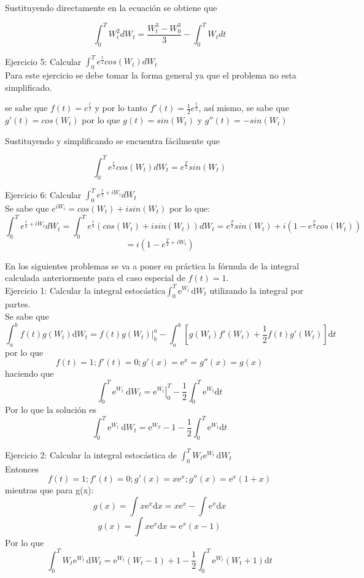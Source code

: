 \documentclass[11pt,fleqn]{book} %
\numberwithin{equation}{section} %
\numberwithin{figure}{section} %
\numberwithin{table}{section} %
\begin{document}
Sustituyendo directamente en la ecuación se obtiene que

$$\int^{T}_{0}W_t^2 dW_t=\frac{W_t^3-W_0^3}{3}-\int^{T}_{0}W_t dt$$

Ejercicio 5: Calcular $\int^{T}_{0}e^{\frac{t}{2}}cos(W_t) dW_t$
\ \\%
Para este ejercicio se debe tomar la forma general ya que el problema no esta simplificado.

se sabe que $f(t)=e^{\frac{t}{2}}$ y por lo tanto 
$f'(t)=\frac{1}{2}e^{\frac{t}{2}}$, así mismo, se sabe que $g'(t)=cos(W_t)$ por lo que $g(t)=sin(W_t)$ y $g''(t)=-sin(W_t)$

Sustituyendo y simplificando se encuentra fácilmente que

$$\int^{T}_{0}e^{\frac{t}{2}}cos(W_t) dW_t= e^{\frac{T}{2}}sin(W_t)$$

Ejercicio 6: Calcular $\int^{T}_{0}e^{\frac{t}{2}+iW_t} dW_t$
\ \\%
Se sabe que $e^{iW_t}=cos(W_t)+i sin (W_t)$ por lo que:
$$\int^{T}_{0}e^{\frac{t}{2}+iW_t} dW_t=\int^{T}_{0}e^{\frac{t}{2}}(cos(W_t)+i sin (W_t)) dW_t=e^{\frac{T}{2}}sin(W_t)+i(1-e^{\frac{T}{2}}cos(W_t))$$
$$=i(1-e^{\frac{T}{2}+iW_t}) $$

En los siguientes problemas se va a poner en práctica la fórmula de la integral calculada anteriormente para el caso especial de $f(t)=1$. 
\ \\%
Ejercicio 1: Calcular la integral estocástica$\int_0^{T} \mathrm{e}^{W_t}\,\mathrm{d}W_t$ utilizando la integral por partes.
\ \\%
Se sabe que
$$ \int_a^{b} f(t) g(W_t) \mathrm{d}W_t = \left. f(t)g(W_t) \right|_{b}^{a} - \int_a^{b}\left[ g(W_t)f'(W_t) + \frac{1}{2}f(t)g'(W_t) \right]\mathrm{d}t $$
por lo que
$$ f(t)=1; f'(t)=0; g'(x) = \mathrm{e}^{x} = g''(x) = g(x) $$
haciendo que
$$    \int_0^{T} \mathrm{e}^{W_t}\ \mathrm{d}W_t = \left. \mathrm{e}^{W_t} \right|_{0}^{T} - \frac{1}{2}\int_0^{T} \mathrm{e}^{W_t}\mathrm{d}t$$
Por lo que la solución es 
$$  \int_0^T \mathrm{e}^{W_t}\ \mathrm{d}W_t = \mathrm{e}^{W_T} - 1 - \frac{1}{2}\int_0^{T} \mathrm{e}^{W_t}\mathrm{d}t$$

Ejercicio 2: Calcular la integral estocástica de $ \int_0^{T} W_t \mathrm{e}^{W_t}\,\mathrm{d}W_t$
\ \\%
Entonces 
$$    f(t)=1; f'(t)=0; g'(x) = x\mathrm{e}^{x};  g''(x) = \mathrm{e}^{x} \left( 1 + x \right)$$
mientras que para g(x):
$$    g(x) = \int x \mathrm{e}^{x} \mathrm{d}x = x \mathrm{e}^{x} - \int \mathrm{e}^{x}\mathrm{d}x$$
$$    g(x) = \int x \mathrm{e}^{x} \mathrm{d}x =  \mathrm{e}^{x}\left( x - 1  \right)$$
Por lo que
$$\int_0^{T} W_t \mathrm{e}^{W_t}\,\mathrm{d}W_t = \mathrm{e}^{W_t}\left( W_t - 1 \right) + 1 - \frac{1}{2} \int_0^{T} \mathrm{e}^{W_t}\left( W_t + 1 \right)\mathrm{d}t$$
\end{document}
